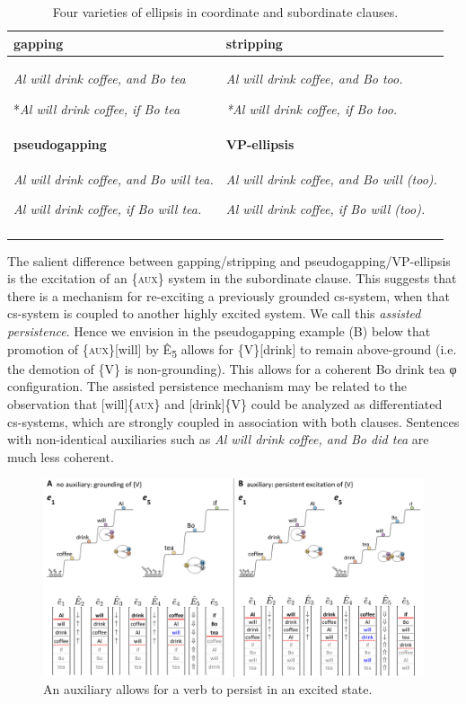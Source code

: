 \begin{table}
\begin{tabularx}{\textwidth}{XX}
\lsptoprule
\textbf{gapping} & \textbf{stripping}\\
\midrule 

\textit{Al will drink coffee, and Bo tea}

*\textit{Al will drink coffee, if Bo tea} & \textit{Al will drink coffee, and Bo too.}

\textit{*Al will drink coffee, if Bo too.}  \\
\tablevspace

\textbf{pseudogapping} & \textbf{VP-ellipsis}\\
\midrule 
\textit{Al will drink coffee, and Bo will tea.}

\textit{Al will drink coffee, if Bo will tea.} & \textit{Al will drink coffee, and Bo will (too).}

\textit{Al will drink coffee, if Bo will (too).}\\
\lspbottomrule
\end{tabularx}
\caption{Four varieties of ellipsis in coordinate and subordinate clauses.}\label{tab:7:1}
\end{table}
  The salient difference between gapping/stripping and pseudogapping/VP-ellipsis is the excitation of an \{\textsc{aux}\} system in the subordinate clause. This suggests that there is a mechanism for re-exciting a previously grounded cs-system, when that cs-system is coupled to another highly excited system. We call this \textit{assisted persistence}. Hence we envision in the pseudogapping example (B) below that promotion of \{\textsc{aux}\}[will] by Ê\textsubscript{5} allows for \{V\}[drink] to remain above-ground (i.e. the demotion of \{V\} is non-grounding). This allows for a coherent {\textbar}Bo drink tea{\textbar} φ configuration. The assisted persistence mechanism may be related to the observation that [will]\{\textsc{aux}\} and [drink]\{V\} could be analyzed as differentiated cs-systems, which are strongly coupled in association with both clauses. Sentences with non-identical auxiliaries such as \textit{Al will drink coffee, and Bo did tea} are much less coherent.

  
\begin{figure}
\includegraphics[width=\textwidth]{figures/Tilsen-img147.png}
\caption{An auxiliary allows for a verb to persist in an excited state.}
\label{fig:7:3}
\end{figure}
 

